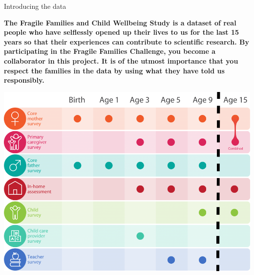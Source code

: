 \documentclass{beamer}
\begin{document}
\begin{frame}

\Large{
\begin{center}
Introducing the data
\end{center}
}

\end{frame}
\begin{frame}

\textbf{The Fragile Families and Child Wellbeing Study is a dataset of real people who have selflessly opened up their lives to us for the last 15 years so that their experiences can contribute to scientific research. By participating in the Fragile Families Challenge, you become a collaborator in this project. It is of the utmost importance that you respect the families in the data by using what they have told us responsibly.}

\end{frame}
\begin{frame}

\begin{center}
\includegraphics[width=\textwidth]{figures/ff_design_public2}
\end{center}

\end{frame}
\end{document}
